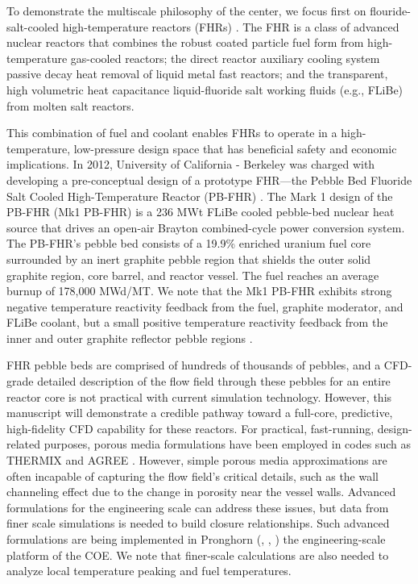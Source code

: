 To demonstrate the multiscale philosophy of the center, we focus first on flouride-salt-cooled high-temperature reactors (FHRs) \cite{forsberg2015fluoride}. The FHR is a class of advanced nuclear reactors that combines the robust coated particle fuel form from high-temperature gas-cooled reactors; the direct reactor auxiliary cooling system passive decay heat removal of liquid metal fast reactors; and the transparent, high volumetric heat capacitance liquid-fluoride salt working fluids (e.g., FLiBe) from molten salt reactors.

This combination of fuel and coolant enables FHRs to operate in a high-temperature, low-pressure design space that has beneficial safety and economic implications. In 2012, University of California - Berkeley was charged with developing a pre-conceptual design of a prototype FHR---the Pebble Bed Fluoride Salt Cooled High-Temperature Reactor (PB-FHR) \cite{cisneros2014technical}. The Mark 1 design of the PB-FHR (Mk1 PB-FHR) is a 236 MWt FLiBe cooled pebble-bed nuclear heat source that drives an open-air Brayton combined-cycle power conversion system. The PB-FHR's pebble bed consists of a 19.9\% enriched uranium fuel core surrounded by an inert graphite pebble region that shields the outer solid graphite region, core barrel, and reactor vessel. The fuel reaches an average burnup of 178,000 MWd/MT. We note that the Mk1 PB-FHR exhibits strong negative temperature reactivity feedback from the fuel, graphite moderator, and FLiBe coolant, but a small positive temperature reactivity feedback from the inner  and outer graphite reflector pebble regions \cite{cisneros2014technical}.

FHR pebble beds are comprised of hundreds of thousands of pebbles, and a CFD-grade detailed description of the flow field through these pebbles for an entire reactor core is not practical with current simulation technology. However, this manuscript will demonstrate a credible pathway toward a full-core, predictive, high-fidelity CFD capability for these reactors. For practical, fast-running, design-related purposes, porous media formulations have been employed in codes such as THERMIX \cite{cleveland1986application} and AGREE \cite{seker2007multiphysics}. However, simple porous media approximations are often incapable of capturing the flow field's critical details, such as the wall channeling effect due to the change in porosity near the vessel walls.  Advanced formulations for the engineering scale can address these issues, but data from finer scale simulations is needed to build closure relationships. Such advanced formulations are being implemented in  Pronghorn (\cite{novak2018pronghorn}, \cite{novak1}, \cite{novak2}) the engineering-scale platform of the COE. We note that finer-scale calculations are also needed to analyze local temperature peaking and fuel temperatures.

